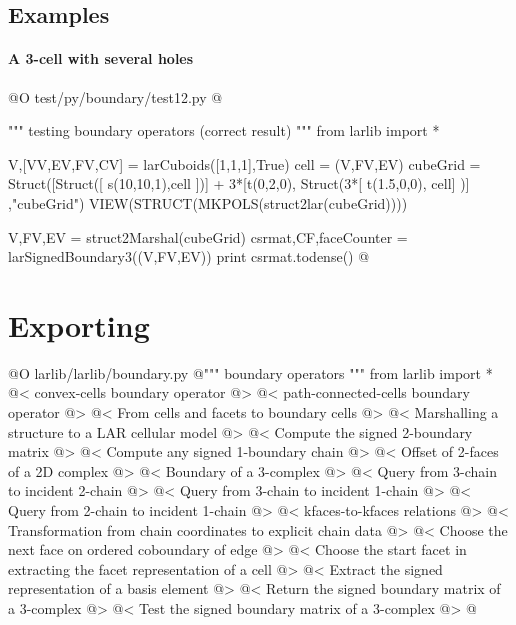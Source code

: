 \documentclass[11pt,oneside]{article}    %
\begin{document}
\subsection{Examples}

\paragraph{A 3-cell with several holes}
@O test/py/boundary/test12.py
@{""" testing boundary operators (correct result) """
from larlib import *

V,[VV,EV,FV,CV] = larCuboids([1,1,1],True)
cell = (V,FV,EV)
cubeGrid =  Struct([Struct([ s(10,10,1),cell ])] + 3*[t(0,2,0), Struct(3*[ t(1.5,0,0), cell] )] ,"cubeGrid")
VIEW(STRUCT(MKPOLS(struct2lar(cubeGrid))))

V,FV,EV = struct2Marshal(cubeGrid)
csrmat,CF,faceCounter = larSignedBoundary3((V,FV,EV))
print csrmat.todense()
@}



\section{Exporting}


@O larlib/larlib/boundary.py
@{""" boundary operators """
from larlib import *
@< convex-cells boundary operator @>
@< path-connected-cells boundary operator @>
@< From cells and facets to boundary cells @>
@< Marshalling a structure to a LAR cellular model @>
@< Compute the signed 2-boundary matrix @>
@< Compute any signed 1-boundary chain @>
@< Offset of 2-faces of a 2D complex @>
@< Boundary of a 3-complex @>
@< Query from 3-chain to incident 2-chain @>
@< Query from 3-chain to incident 1-chain @>
@< Query from 2-chain to incident 1-chain @>
@< kfaces-to-kfaces relations @>
@< Transformation from chain coordinates to explicit chain data @>
@< Choose the next face on ordered coboundary of edge @>
@< Choose the start facet in extracting the facet representation of a cell @>
@< Extract the signed representation of a basis element @>
@< Return the signed boundary matrix of a 3-complex @>
@< Test the signed boundary matrix of a 3-complex @>
@}
\end{document}
